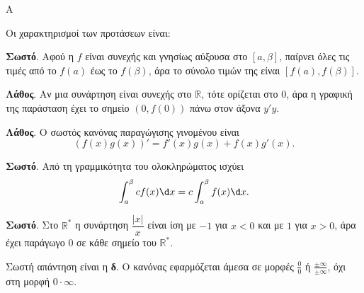 \begin{thema}{Α}
\begin{erwthma}
\item {}

\item {}

\item {}

\item Οι χαρακτηρισμοί των προτάσεων είναι:
\begin{alist}
\item \textbf{Σωστό}. Αφού η $f$ είναι συνεχής και γνησίως αύξουσα στο $[a,\beta]$, παίρνει όλες τις τιμές από το $f(a)$ έως το $f(\beta)$, άρα το σύνολο τιμών της είναι $[f(a),f(\beta)]$.
\item \textbf{Λάθος}. Αν μια συνάρτηση είναι συνεχής στο $\mathbb{R}$, τότε ορίζεται στο $0$, άρα η γραφική της παράσταση έχει το σημείο $(0,f(0))$ πάνω στον άξονα $y'y$.
\item \textbf{Λάθος}. Ο σωστός κανόνας παραγώγισης γινομένου είναι
\[ (f(x)g(x))'=f'(x)g(x)+f(x)g'(x). \]
\item \textbf{Σωστό}. Από τη γραμμικότητα του ολοκληρώματος ισχύει
\[ \dint_a^\beta c f(x)\d x=c\dint_a^\beta f(x)\d x. \]
\item \textbf{Σωστό}. Στο $\mathbb{R}^*$ η συνάρτηση $\dfrac{|x|}{x}$ είναι ίση με $-1$ για $x<0$ και με $1$ για $x>0$, άρα έχει παράγωγο $0$ σε κάθε σημείο του $\mathbb{R}^*$.
\end{alist}

\item Σωστή απάντηση είναι η \textbf{δ}. Ο κανόνας  εφαρμόζεται άμεσα σε μορφές $\frac{0}{0}$ ή $\frac{\pm\infty}{\pm\infty}$, όχι στη μορφή $0\cdot\infty$.
\end{erwthma}
\end{thema}

